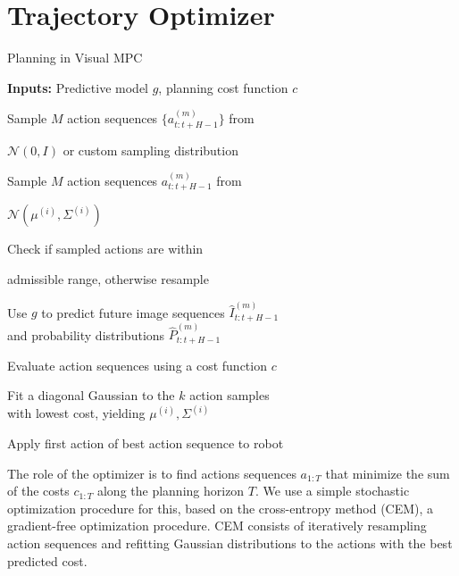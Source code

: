 \section{Trajectory Optimizer}

\begin{algorithm}[ht]
\caption{Planning in Visual MPC}
\label{alg:opt}
\begin{algorithmic}[1]
\State \textbf{Inputs:} Predictive model $g$, planning cost function $c$

\State \begin{varwidth}[t]{\linewidth}
	Sample $M$ action sequences $\{a^{(m)}_{t:t+H-1}\}$ from \par $\mathcal N(0, I)$ or
	custom sampling distribution
\end{varwidth}
\Else
\State \begin{varwidth}[t]{\linewidth}
	Sample $M$ action sequences ${a^{(m)}_{t:t+H-1}}$ from \par 
	$\mathcal N(\mu^{(i)}, \Sigma^{(i)})$
\end{varwidth}
\EndIf
\State 
\begin{varwidth}[t]{\linewidth}
Check if sampled actions are within \par
admissible range, otherwise resample
\end{varwidth}
\State  \begin{varwidth}[t]{\linewidth}
	Use $g$ to predict future  image sequences $\hat{I}_{t:t+H-1}^{(m)}$\\ and probability distributions $\hat{P}_{t:t+H-1}^{(m)}$
\end{varwidth}
\State Evaluate action sequences using a cost function $c$
\State  \begin{varwidth}[t]{\linewidth}
	Fit a diagonal Gaussian to the $k$  action samples\\ with lowest cost,
	yielding $\mu^{(i)}, \Sigma^{(i)}$
\end{varwidth}
\EndFor
\State Apply first action of best action sequence to robot
\EndFor
\end{algorithmic}
\end{algorithm}


\label{sec:optimizer}
The role of the optimizer is to find actions sequences $a_{1:T}$ that minimize the sum of the costs $c_{1:T}$ along the planning horizon $T$. We use a simple stochastic optimization procedure for this, based on the cross-entropy method (CEM), a gradient-free optimization procedure. CEM consists of iteratively resampling action sequences and refitting Gaussian distributions to the actions with the best predicted cost.

